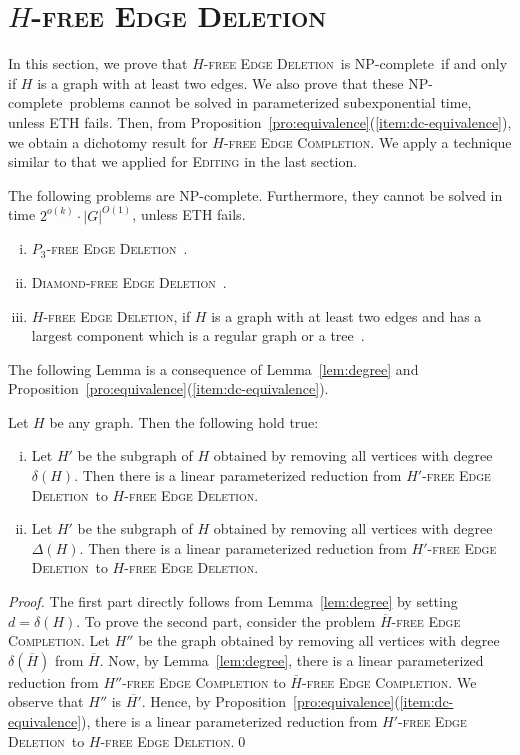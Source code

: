 \documentclass[envcountsame,envcountsect,10pt,oribibl]{llncs}
\newcommand{\pname}[1]{\textnormal{\textsc{#1}}}
\newcommand{\cclass}[1]{\textnormal{\textsf{#1}}}
\newcommand{\HED}{\pname{$H$-free Edge Deletion}}
\newcommand{\HEC}{\pname{$H$-free Edge Completion}}
\newcommand{\HDED}{\pname{$H'$-free Edge Deletion}}
\newcommand{\HBEC}{\pname{$\overline{H}$-free Edge Completion}}
\newcommand{\PTED}{\pname{$P_3$-free Edge Deletion}}
\newcommand{\DED}{\pname{Diamond-free Edge Deletion}}
\newcommand{\NPC}{\cclass{NP-complete}}
\begin{document}
\section{\HED}
\label{sec:deletion}

In this section, we prove that
\HED\ is \NPC\ if and only if $H$ is a graph with 
at least two edges. We also prove that
these \NPC\ problems cannot be solved in parameterized subexponential time,
unless ETH fails. Then, from Proposition~\ref{pro:equivalence}(\ref{item:dc-equivalence}), we
obtain a dichotomy result for \HEC. We apply a technique similar to that we 
applied for \textsc{Editing} in the last section. 


\begin{proposition}
  \label{pro:deletion-base}
  The following problems are \NPC. Furthermore, they cannot be 
  solved in time $2^{o(k)}\cdot |G|^{O(1)}$, unless ETH fails.
  \begin{enumerate}[(i)]
  \item\label{item:deletion-p3} \PTED~\cite{komusiewicz2012cluster}.
  \item\label{item:deletion-diamond} \DED~\cite{DBLP:journals/disopt/FellowsGKNU11,DBLP:conf/ipec/SandeepS15}.
  \item\label{item:deletion-tree-reg} \HED, if $H$ is a graph with at least two edges and
    has a largest component which is a regular graph or a tree~\cite{DBLP:conf/cocoa/AravindSS15}.
  \end{enumerate}
\end{proposition}

The following Lemma is a consequence of Lemma~\ref{lem:degree} and Proposition~\ref{pro:equivalence}(\ref{item:dc-equivalence}).

\begin{lemma}
  \label{lem:rotate}
  Let $H$ be any graph. Then the following hold true:
  \begin{enumerate}[(i)]
  \item Let $H'$ be the subgraph of $H$ obtained by removing all
    vertices with degree $\delta(H)$.
    Then there is a linear parameterized reduction from \HDED\ to \HED.
  \item Let $H'$ be the subgraph of $H$ obtained by removing all
    vertices with degree $\Delta(H)$.
    Then there is a linear parameterized reduction from \HDED\ to \HED. 
  \end{enumerate}
\end{lemma}
\begin{proof}
  The first part directly follows from Lemma~\ref{lem:degree} by setting $d=\delta(H)$.
  To prove the second part, consider the problem \HBEC. 
  Let $H''$ be the graph obtained by removing all vertices with degree $\delta(\overline{H})$ from $\overline{H}$. 
  Now, by Lemma~\ref{lem:degree},
  there is a linear parameterized reduction from \textsc{$H''$-free Edge Completion} to \HBEC.
  We observe that $H''$ is $\overline{H'}$. Hence, by Proposition~\ref{pro:equivalence}(\ref{item:dc-equivalence}),
  there is a linear parameterized reduction from \HDED\ to \HED.\qed
\end{proof}
\end{document}
